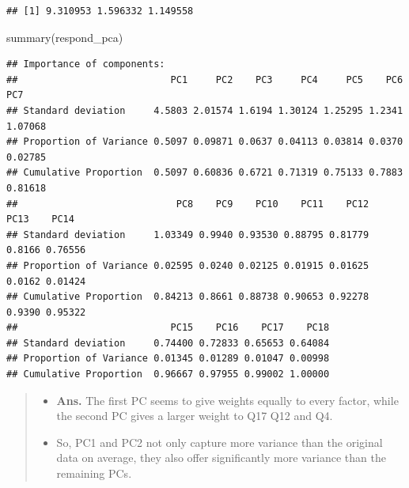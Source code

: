 \documentclass[
]{article}
\newenvironment{Shaded}{\begin{snugshade}}{\end{snugshade}}
\newcommand{\DecValTok}[1]{\textcolor[rgb]{0.00,0.00,0.81}{#1}}
\newcommand{\FunctionTok}[1]{\textcolor[rgb]{0.00,0.00,0.00}{#1}}
\newcommand{\NormalTok}[1]{#1}
\newcommand{\SpecialCharTok}[1]{\textcolor[rgb]{0.00,0.00,0.00}{#1}}
\begin{document}
\begin{Shaded}
\end{Shaded}

\begin{verbatim}
## [1] 9.310953 1.596332 1.149558
\end{verbatim}

\begin{Shaded}
\begin{Highlighting}[]
\FunctionTok{summary}\NormalTok{(respond\_pca)}
\end{Highlighting}
\end{Shaded}

\begin{verbatim}
## Importance of components:
##                           PC1     PC2    PC3     PC4     PC5    PC6     PC7
## Standard deviation     4.5803 2.01574 1.6194 1.30124 1.25295 1.2341 1.07068
## Proportion of Variance 0.5097 0.09871 0.0637 0.04113 0.03814 0.0370 0.02785
## Cumulative Proportion  0.5097 0.60836 0.6721 0.71319 0.75133 0.7883 0.81618
##                            PC8    PC9    PC10    PC11    PC12   PC13    PC14
## Standard deviation     1.03349 0.9940 0.93530 0.88795 0.81779 0.8166 0.76556
## Proportion of Variance 0.02595 0.0240 0.02125 0.01915 0.01625 0.0162 0.01424
## Cumulative Proportion  0.84213 0.8661 0.88738 0.90653 0.92278 0.9390 0.95322
##                           PC15    PC16    PC17    PC18
## Standard deviation     0.74400 0.72833 0.65653 0.64084
## Proportion of Variance 0.01345 0.01289 0.01047 0.00998
## Cumulative Proportion  0.96667 0.97955 0.99002 1.00000
\end{verbatim}

\begin{quote}
\begin{itemize}
\item
  \textbf{Ans.} The first PC seems to give weights equally to every
  factor, while the second PC gives a larger weight to Q17 Q12 and Q4.
\item
  So, PC1 and PC2 not only capture more variance than the original data
  on average, they also offer significantly more variance than the
  remaining PCs.
\end{itemize}
\end{quote}
\end{document}
